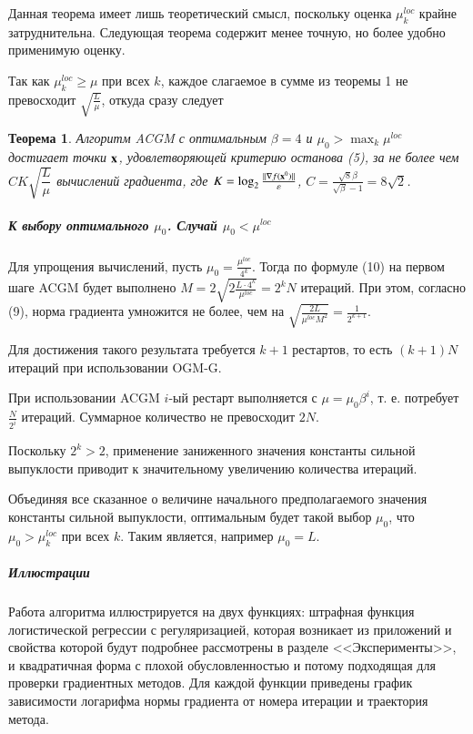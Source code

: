 \documentclass{crm-article}
\newtheorem{theorems}{Теорема}
\begin{document}
Данная теорема имеет лишь теоретический смысл, поскольку оценка $\mu_k^{loc}$ крайне затруднительна. Следующая теорема содержит менее точную, но более удобно применимую оценку.

Так как $\mu_k^{loc}\geq \mu$ при всех $k$, каждое слагаемое в сумме из теоремы 1 не превосходит $\sqrt{\frac{L}{\mu}}$, откуда сразу следует

\begin{theorems}
Алгоритм ACGM с оптимальным $\beta=4$ и $\mu_0>\max_k \mu^{loc}$ достигает точки ${\bf x}$, удовлетворяющей критерию останова (5), за не более чем $CK \sqrt{\dfrac{L}{\mu}}$ вычислений градиента, где $K=\log_2\frac{||\nabla f({\bf x}^0)||}{\varepsilon}$, $C=\frac{\sqrt{8}\beta}{\sqrt{\beta}-1}=8\sqrt{2}$.
\end{theorems}

\subparagraph{К выбору оптимального $\mu_0$. Случай $\mu_0<\mu^{loc}$}

Для упрощения вычислений, пусть $\mu_0 = \frac{\mu^{loc}}{4^k}$. Тогда по формуле (10) на первом шаге ACGM будет выполнено $M=2\sqrt{2\frac{L\cdot 4^k}{\mu^{loc}}} = 2^kN$ итераций. При этом, согласно (9), норма градиента умножится не более, чем на $\sqrt{\frac{2L}{\mu^{loc} M^2}} = \frac{1}{2^{k+1}}$.

Для достижения такого результата требуется $k+1$ рестартов, то есть $(k+1)N$ итераций при использовании OGM-G.

При использовании ACGM $i$-ый рестарт выполняется с $\mu = \mu_0\beta^i$, т. е. потребует $\frac{N}{2^i}$ итераций. Суммарное количество не превосходит $2N$.

Поскольку $2^k>2$, применение заниженного значения константы сильной выпуклости приводит к значительному увеличению количества итераций.

Объединяя все сказанное о величине начального предполагаемого значения константы сильной выпуклости, оптимальным будет такой выбор $\mu_0$, что $\mu_0>\mu_k^{loc}$ при всех $k$. Таким является, например $\mu_0=L$.

\subparagraph{Иллюстрации}

Работа алгоритма иллюстрируется на двух функциях: штрафная функция логистической регрессии с регуляризацией, которая возникает из приложений и свойства которой будут подробнее рассмотрены в разделе <<Эксперименты>>, и квадратичная форма с плохой обусловленностью и потому подходящая для проверки градиентных методов. Для каждой функции приведены график зависимости логарифма нормы градиента от номера итерации и траектория метода.
\end{document}

